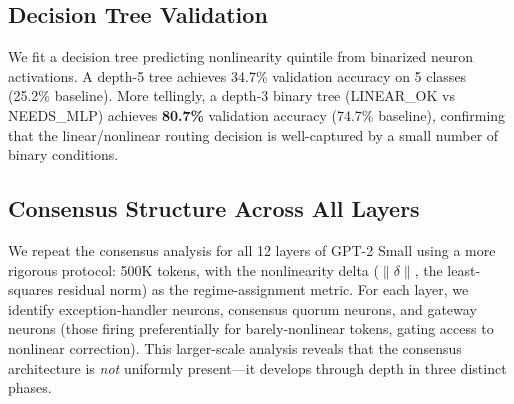 \documentclass{article}
\begin{document}
\subsection{Decision Tree Validation}

We fit a decision tree predicting nonlinearity quintile from binarized neuron activations.
A depth-5 tree achieves 34.7\% validation accuracy on 5 classes (25.2\% baseline).
More tellingly, a depth-3 binary tree (LINEAR\_OK vs NEEDS\_MLP) achieves \textbf{80.7\%}
validation accuracy (74.7\% baseline), confirming that the linear/nonlinear routing decision
is well-captured by a small number of binary conditions.

\subsection{Consensus Structure Across All Layers}
\label{sec:alllayers}

We repeat the consensus analysis for all 12 layers of GPT-2 Small using a more rigorous
protocol: 500K tokens, with the nonlinearity delta ($\|\delta\|$, the least-squares residual
norm) as the regime-assignment metric. For each layer, we identify exception-handler neurons,
consensus quorum neurons, and gateway neurons (those firing preferentially for barely-nonlinear
tokens, gating access to nonlinear correction). This larger-scale analysis reveals that the
consensus architecture is \emph{not} uniformly present---it develops through depth in three
distinct phases.
\end{document}
